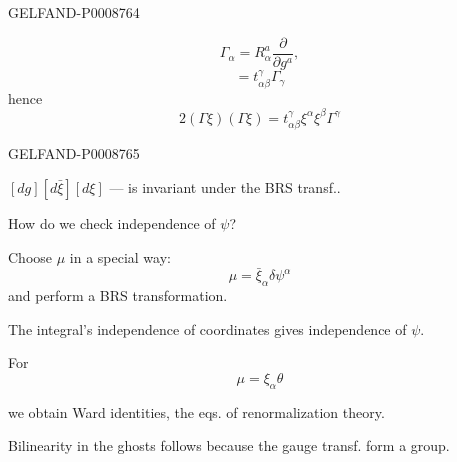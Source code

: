 \begin{GelfandAdjacentEvidence}{GELFAND-P000876}{4}


\begin{equation*}
\Gamma_\alpha=R_\alpha^a\frac{\partial}{\partial g^a},
\tag{47}
\end{equation*}
\begin{equation*}
[\Gamma_\alpha,\Gamma_\beta]=t^\gamma_{\alpha\beta}\Gamma_\gamma
\tag{48}
\end{equation*}
hence
\begin{equation*}
2(\Gamma\xi)(\Gamma\xi)=t^\gamma_{\alpha\beta}\xi^\alpha\xi^\beta\Gamma^\gamma
\tag{49}
\end{equation*}
\end{GelfandAdjacentEvidence}
\begin{GelfandAdjacentEvidence}{GELFAND-P000876}{5}


$[dg][d\bar\xi][d\xi]$ --- is invariant under the BRS transf..

How do we check independence of $\psi$?

Choose $\mu$ in a special way:
\begin{equation*}
\mu=\bar\xi_\alpha\delta\psi^\alpha
\tag{50}
\end{equation*}
and perform a BRS transformation.

The integral's independence of coordinates gives independence of $\psi$.

For
\begin{equation*}
\mu=\xi_\alpha\theta
\tag{51}
\end{equation*}
\end{GelfandAdjacentEvidence}


we obtain Ward identities, the eqs. of renormalization theory.

Bilinearity in the ghosts follows because the gauge transf. form a group.


